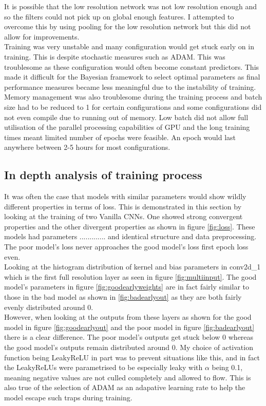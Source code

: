 \documentclass{article}
\begin{document}
It is possible that the low resolution network was not low resolution enough and so the filters could not pick up on global enough features. I attempted to overcome this by using pooling for the low resolution network but this did not allow for improvements.\\

Training was very unstable and many configuration would get stuck early on in training. This is despite stochastic measures such as ADAM. This was troublesome as these configuration would often become constant predictors. This made it difficult for the Bayesian framework to select optimal parameters as final performance measures became less meaningful due to the instability of training. \\

Memory management was also troublesome during the training process and batch size had to be reduced to 1 for certain configurations and some configurations did not even compile due to running out of memory. Low batch did not allow full utilisation of the parallel processing capabilities of GPU and the long training times meant limited number of epochs were feasible. An epoch would last anywhere between 2-5 hours for most configurations. \\

\subsection{In depth analysis of training process}
It was often the case that models with similar parameters would show wildly different properties in terms of loss. This is demonstrated in this section by looking at the training of two Vanilla CNNs. One showed strong convergent properties and the other divergent properties as shown in figure \ref{fig:loss}. These models had parameters ............. and identical structure and data preprocessing. The poor model's loss never approaches the good model's loss first epoch loss even.\\

Looking at the histogram distribution of kernel and bias parameters in conv2d\_1 which is the first full resolution layer as seen in figure \ref{fig:multiinput}. The good model's parameters in figure \ref{fig:goodearlyweights} are in fact fairly similar to those in the bad model as shown in \ref{fig:badearlyout} as they are both fairly evenly distributed around 0. \\

However, when looking at the outputs from these layers as shown for the good model in figure \ref{fig:goodearlyout} and the poor model in figure \ref{fig:badearlyout} there is a clear difference. The poor model's outputs get stuck below 0 whereas the good model's outputs remain distributed around 0. My choice of activation function being LeakyReLU in part was to prevent situations like this, and in fact the LeakyReLUs were parametrised to be especially leaky with $\alpha$ being 0.1, meaning negative values are not culled completely and allowed to flow. This is also true of the selection of ADAM as an adapative learning rate to help the model escape such traps during training.\\
\end{document}
